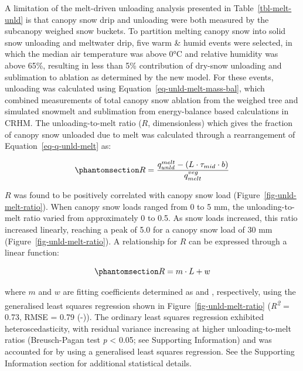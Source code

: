 \documentclass[
]{agujournal2019}
\begin{document}
A limitation of the melt-driven unloading analysis presented in
Table~\ref{tbl-melt-unld} is that canopy snow drip and unloading were
both measured by the subcanopy weighed snow buckets. To partition
melting canopy snow into solid snow unloading and meltwater drip, five
warm \& humid events were selected, in which the median air temperature
was above 0°C and relative humidity was above 65\%, resulting in less
than 5\% contribution of dry-snow unloading and sublimation to ablation
as determined by the new model. For these events, unloading was
calculated using Equation~\ref{eq-unld-melt-mass-bal}, which combined
measurements of total canopy snow ablation from the weighed tree and
simulated snowmelt and sublimation from energy-balance based
calculations in CRHM. The unloading-to-melt ratio (\(R\), dimensionless)
which gives the fraction of canopy snow unloaded due to melt was
calculated through a rearrangement of Equation~\ref{eq-q-unld-melt} as:

\begin{equation}\phantomsection\label{eq-melt-unld-ratio}{
R = \frac{q_{unld}^{melt} - (L \cdot \tau_{mid} \cdot b)}{q_{melt}^{veg}}
}\end{equation}

\(R\) was found to be positively correlated with canopy snow load
(Figure~\ref{fig-unld-melt-ratio}). When canopy snow loads ranged from 0
to 5 mm, the unloading-to-melt ratio varied from approximately 0 to 0.5.
As snow loads increased, this ratio increased linearly, reaching a peak
of 5.0 for a canopy snow load of 30 mm
(Figure~\ref{fig-unld-melt-ratio}). A relationship for \(R\) can be
expressed through a linear function:

\begin{equation}\phantomsection\label{eq-fm}{
R = m \cdot L + w
}\end{equation}

where \(m\) and \(w\) are fitting coefficients determined as and ,
respectively, using the generalised least squares regression shown in
Figure~\ref{fig-unld-melt-ratio} (\emph{R\textsuperscript{2}} = 0.73,
RMSE = 0.79 (-)). The ordinary least squares regression exhibited
heteroscedasticity, with residual variance increasing at higher
unloading-to-melt ratios (Breusch-Pagan test \emph{p} \textless{} 0.05;
see Supporting Information) and was accounted for by using a generalised
least squares regression. See the Supporting Information section for
additional statistical details.
\end{document}
